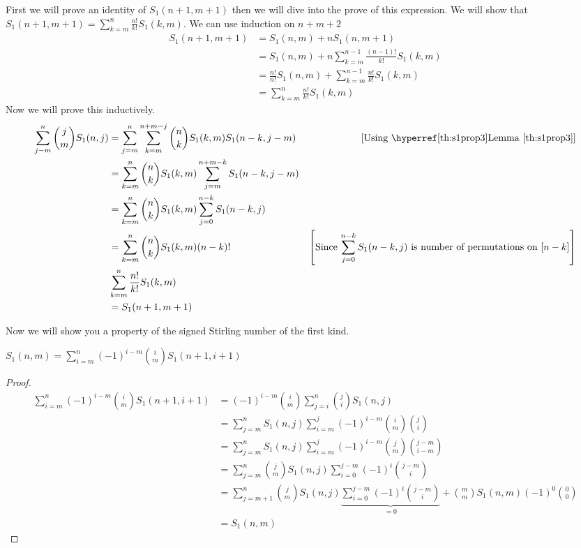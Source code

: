 \documentclass[twoside]{article}
\begin{document}
\begin{alg-proof}
	First we will prove an identity of $S_1(n+1,m+1)$ then we will dive into the prove of this expression. We will show that  $S_1(n+1,m+1)=\sum\limits_{k=m}^n\frac{n!}{k!}S_1(k,m)$. We can use induction on $n+m+2$\begin{align*}
		S_1(n+1,m+1) & =S_1(n,m)+nS_1(n,m+1)                                          \\
		& =S_1(n,m) +n\sum_{k=m}^{n-1}\frac{(n-1)!}{k!}S_1(k,m)          \\
		& = \frac{n!}{n!}S_1(n,m) +\sum_{k=m}^{n-1}\frac{n!}{k!}S_1(k,m) \\
		& =\sum_{k=m}^{n}\frac{n!}{k!}S_1(k,m)
	\end{align*}
	Now we will prove this inductively. 
	\begin{align*}
		\sum_{j-m}^n\binom{j}{m}S_1(n,j) & = \sum_{j=m}^n\sum_{k=m}^{n+m-j}\binom{n}{k}S_1(k,m)S_1(n-k,j-m) & [\text{Using \lmref{s1prop3}}]                                                                       \\
		& = \sum_{k=m}^n\binom{n}{k}S_1(k,m)\sum_{j=m}^{n+m-k}S_1(n-k,j-m) &  \\
		& = \sum_{k=m}^n\binom{n}{k}S_1(k,m)\sum_{j=0}^{n-k}S_1(n-k,j)     &  \\
		& = \sum_{k=m}^n\binom{n}{k}S_1(k,m)(n-k)!                         & \lt[\text{Since $\displaystyle\sum_{j=0}^{n-k}S_1(n-k,j)$ is  number of permutations on $[n-k]$}\rt] \\
		& \sum_{k=m}^n\frac{n!}{k!}S_1(k,m)                                &  \\
		& = S_1(n+1,m+1)                                                   &
	\end{align*}
	
\end{alg-proof}

Now we will show you a property of the signed Stirling number of the first kind.
\begin{Theorem}{}{}
	$S_1(n,m)=\displaystyle\sum\limits_{i=m}^n(-1)^{i-m}\binom{i}{m}S_1(n+1,i+1)$
\end{Theorem}
\begin{proof}
	\begin{align*}
		\sum_{i=m}^n(-1)^{i-m}\binom{i}{m}S_1(n+1,i+1) & = (-1)^{i-m}\binom{i}{m}\sum_{j=i}^n\binom{j}{i}S_1(n,j)\\
		& = \sum_{j=m}^nS_1(n,j)\sum_{i=m}^j (-1)^{i-m}\binom{i}{m}\binom{j}{i}\\
		& = \sum_{j=m}^n S_1(n,j)\sum_{i=m}^j (-1)^{i-m}\binom{j}{m}\binom{j-m}{i-m}\\
		& = \sum_{j=m}^n \binom{j}{m}S_1(n,j)\sum_{i=0}^{j-m} (-1)^{i}\binom{j-m}{i}\\
		& = \sum_{j=m+1}^n \binom{j}{m}S_1(n,j)\underbrace{\sum_{i=0}^{j-m} (-1)^{i}\binom{j-m}{i}}_{=0}+\binom{m}{m}S_1(n,m)(-1)^0\binom{0}{0}\\
		& = S_1(n,m)
	\end{align*}
\end{proof}
\end{document}
